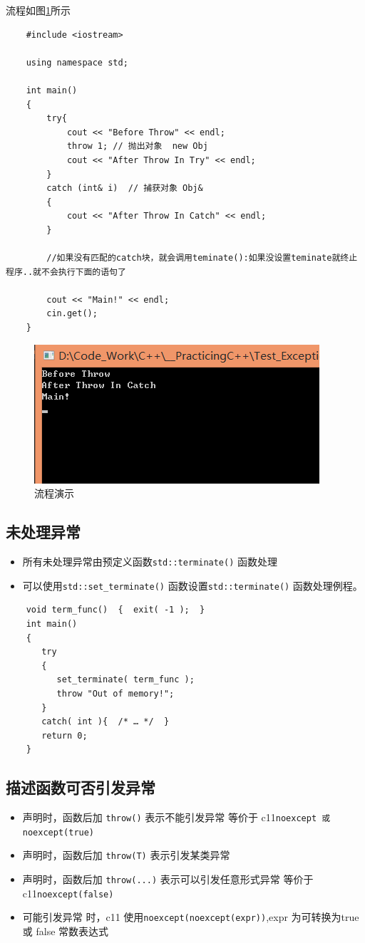 \documentclass[UTF8,a4paper,12pt]{ctexbook}
\begin{document}
			流程如图\ref{process_error}所示
\begin{lstlisting}
	#include <iostream>
	
	using namespace std;
	
	int main()
	{
		try{
			cout << "Before Throw" << endl;
			throw 1; // 抛出对象  new Obj
			cout << "After Throw In Try" << endl;
		}
		catch (int& i)	// 捕获对象 Obj& 
		{
			cout << "After Throw In Catch" << endl;
		}
		
		//如果没有匹配的catch块，就会调用teminate():如果没设置teminate就终止程序..就不会执行下面的语句了
		
		cout << "Main!" << endl;
		cin.get();
	}
\end{lstlisting}
			
			\begin{figure}[h]
				\centering
				\includegraphics[scale = 1]{Exception_Process.png}
				\caption{流程演示}
				\label{process_error}
			\end{figure}
	
	\subsection{未处理异常}
		\begin{itemize}
			\item 所有未处理异常由预定义函数\verb|std::terminate()| 函数处理
			\item 可以使用\verb|std::set_terminate()| 函数设置\verb|std::terminate()| 函数处理例程。
		\end{itemize}
		
		\begin{lstlisting}
	void term_func()  {  exit( -1 );  }
	int main()
	{
	   try
	   {
	      set_terminate( term_func );
	      throw "Out of memory!";
	   }
	   catch( int ){  /* … */  }
	   return 0;
	}
		\end{lstlisting}
	\subsection{描述函数可否引发异常}
		\begin{itemize}
			\item 声明时，函数后加 \verb|throw()| 表示不能引发异常 等价于 c11\verb|noexcept 或 noexcept(true)|
			\item 声明时，函数后加 \verb|throw(T)| 表示引发某类异常 
			\item 声明时，函数后加 \verb|throw(...)| 表示可以引发任意形式异常 等价于 c11\verb|noexcept(false)|
			\item 可能引发异常 时，c11 使用\verb|noexcept(noexcept(expr))|,expr 为可转换为true  或 false 常数表达式
		\end{itemize}	
		
\end{document}
